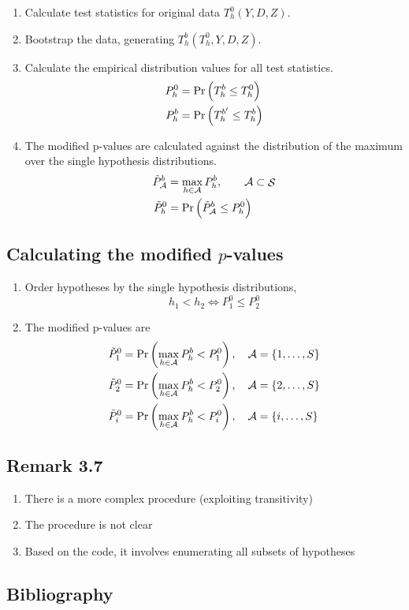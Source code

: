 \documentclass[10pt]{article}
\DeclareMathOperator{\hypSet}{\mathcal{S}}
\begin{document}
	\begin{enumerate}
		\item Calculate test statistics for original data $T^0_h(Y,D,Z)$.
		\item Bootstrap the data, generating $T^b_h(T^0_h,Y,D,Z)$.
		\item Calculate the empirical distribution values for all test statistics.
			\begin{align*}
				P^0_h &= \myPr{T^b_h \leq T^0_h}  \\
				P^b_h &= \myPr{T^{b^\prime}_h \leq T^b_h} 
			\end{align*}
		\item The modified p-values are calculated against the distribution of the maximum over the single hypothesis distributions.
			\begin{align*}
				\tilde{P}^b_{\mathcal{A}} &= \max_{h\in\mathcal{A}} P^b_h, \qquad \mathcal{A} \subset \hypSet \\
				\tilde{P}^0_h &= \myPr{ \tilde{P}^b_{\mathcal{A}} \leq P^0_h }
			\end{align*}			
	\end{enumerate}

	\subsection[Calculating the modified p-values]{Calculating the modified $p$-values}

	\begin{enumerate}[nosep]
		\item Order hypotheses by the single hypothesis distributions,
	\begin{equation*} h_1 < h_2 \iff P^0_{1} \leq P^0_{2} \end{equation*}
		\item The modified p-values are
			\begin{align*}
				\tilde{P}^0_1 &= \myPr{\max_{h\in\mathcal{A}} P^b_h < P^0_1 },\quad \mathcal{A} = \set{1,\ldots, S} \\
				\tilde{P}^0_2 &= \myPr{\max_{h\in\mathcal{A}} P^b_h < P^0_2 },\quad \mathcal{A} = \set{2,\ldots, S} \\
				\tilde{P}^0_i &= \myPr{\max_{h\in\mathcal{A}} P^b_h < P^0_i },\quad \mathcal{A} = \set{i,\ldots, S}
			\end{align*}			
	\end{enumerate}
	
	\subsection{Remark 3.7}

	\begin{enumerate}
		\item There is a more complex procedure (exploiting transitivity)
		\item The procedure is not clear
		\item Based on the code, it involves enumerating all subsets of hypotheses
	\end{enumerate}

	\subsection{Bibliography}

	\printbibliography
\end{document}
